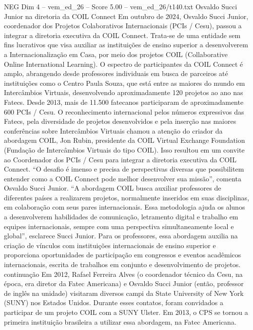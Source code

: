 \begin{textsample}{NEG Dim 4 – vem\_ed\_26 – Score 5.00 – vem\_ed\_26/t140.txt}  \label{ex:f4_neg_157}
Osvaldo Succi Junior na diretoria da COIL Connect Em outubro de 2024, Osvaldo Succi Junior, coordenador dos Projetos Colaborativos Internacionais (PCIs / Cesu), passou a integrar a diretoria executiva da COIL Connect.
Trata-se de uma entidade sem fins lucrativos que visa auxiliar as instituições de ensino superior a desenvolverem a Internacionalização em Casa, por meio dos projetos COIL (Collaborative Online International Learning).
O espectro de participantes da COIL Connect é amplo, abrangendo desde professores individuais em busca de parceiros até instituições como o Centro Paula Souza, que está entre as maiores do mundo em Intercâmbios Virtuais, desenvolvendo aproximadamente 120 projetos ao ano nas Fatecs.
Desde 2013, mais de 11.500 fatecanos participaram de aproximadamente 600 PCIs / Cesu.
O reconhecimento internacional pelos números expressivos das Fatecs, pela diversidade de projetos desenvolvidos e pela inserção nas maiores conferências sobre Intercâmbios Virtuais chamou a atenção do criador da abordagem COIL, Jon Rubin, presidente da COIL Virtual Exchange Foundation (Fundação de Intercâmbios Virtuais do tipo COIL).
Isso resultou em um convite ao Coordenador dos PCIs / Cesu para integrar a diretoria executiva da COIL Connect. “O desafio é imenso e precisa de perspectivas diversas que possibilitem entender como a COIL Connect pode melhor desenvolver sua missão”, comenta Osvaldo Succi Junior. “A abordagem COIL busca auxiliar professores de diferentes países a realizarem projetos, normalmente inseridos em suas disciplinas, em colaboração com seus pares internacionais.
Essa metodologia ajuda os alunos a desenvolverem habilidades de comunicação, letramento digital e trabalho em equipes internacionais, sempre com uma perspectiva simultaneamente local e global”, esclarece Succi Junior.
Para os professores, essa abordagem auxilia na criação de vínculos com instituições internacionais de ensino superior e proporciona oportunidades de participação em congressos e eventos acadêmicos internacionais, escrita de trabalhos em conjunto e desenvolvimento de projetos. continuação Em 2012, Rafael Ferreira Alves (o coordenador técnico da Cesu, na época, era diretor da Fatec Americana) e Osvaldo Succi Junior (então, professor de inglês na unidade) visitaram diversos campi da State University of New York (SUNY) nos Estados Unidos.
Durante esses contatos, foram convidados a participar de um projeto COIL com a SUNY Ulster.
Em 2013, o CPS se tornou a primeira instituição brasileira a utilizar essa abordagem, na Fatec Americana.

\end{textsample}
